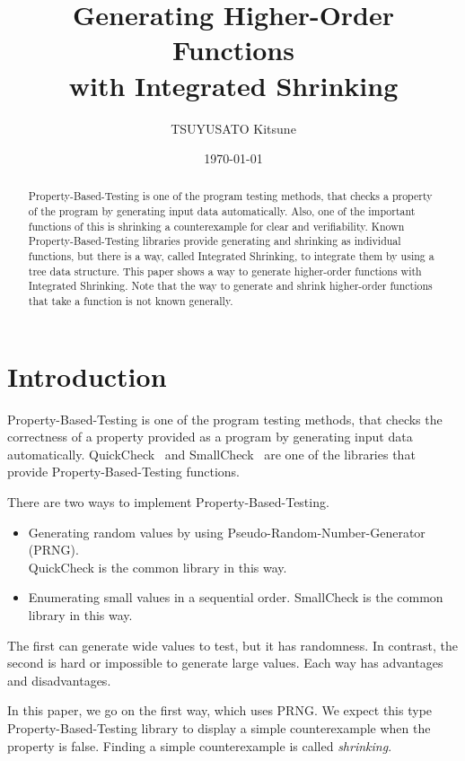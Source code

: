 \documentclass[a4paper,10pt]{article}
\title{Generating Higher-Order Functions\\with Integrated Shrinking}
\author{TSUYUSATO Kitsune}
\date{\today}
\theoremstyle{definition}
\begin{document}
\maketitle

\begin{abstract}
  Property-Based-Testing is one of the program testing methods, that checks a property of the program by generating input data automatically.
  Also, one of the important functions of this is shrinking a counterexample for clear and verifiability.
  Known Property-Based-Testing libraries provide generating and shrinking as individual functions, but there is a way, called Integrated Shrinking, to integrate them by using a tree data structure.
  This paper shows a way to generate higher-order functions with Integrated Shrinking.
  Note that the way to generate and shrink higher-order functions that take a function is not known generally.
\end{abstract}

\section{Introduction}

Property-Based-Testing is one of the program testing methods, that checks the correctness of a property provided as a program by generating input data automatically.
QuickCheck~\cite{claessen_quickcheck_2011} and SmallCheck~\cite{runciman_smallcheck_2008} are one of the libraries that provide Property-Based-Testing functions.

There are two ways to implement Property-Based-Testing.

\begin{itemize}
  \item Generating random values by using Pseudo-Random-Number-Generator (PRNG).\\QuickCheck is the common library in this way.
  \item Enumerating small values in a sequential order. SmallCheck is the common library in this way.
\end{itemize}

The first can generate wide values to test, but it has randomness.
In contrast, the second is hard or impossible to generate large values.
Each way has advantages and disadvantages.

In this paper, we go on the first way, which uses PRNG.
We expect this type Property-Based-Testing library to display a simple counterexample when the property is false.
Finding a simple counterexample is called \textit{shrinking}.
\end{document}
